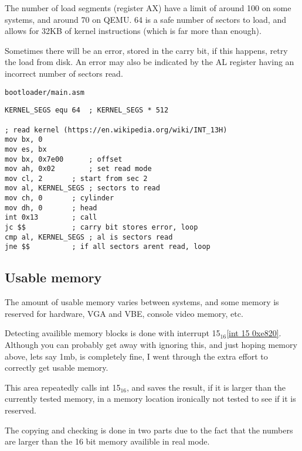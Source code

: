 \documentclass{article}
\begin{document}
The number of load segments (register AX)\cite{int 13h} have a limit of around 100
on some systems, and around 70 on QEMU. 64 is a safe number of sectors to load,
and allows for 32KB of kernel instructions (which is far more than enough).

Sometimes there will be an error, stored in the carry bit\cite{int 13h}, if this
happens, retry the load from disk. An error may also be indicated by the AL register
having an incorrect number of sectors read.

\begin{verbatim}
bootloader/main.asm
\end{verbatim}
\begin{verbatim}
KERNEL_SEGS equ 64	; KERNEL_SEGS * 512

; read kernel (https://en.wikipedia.org/wiki/INT_13H)
mov bx, 0
mov es, bx
mov bx, 0x7e00		; offset
mov ah, 0x02		; set read mode
mov cl, 2		; start from sec 2
mov al, KERNEL_SEGS	; sectors to read
mov ch, 0		; cylinder
mov dh, 0		; head
int 0x13		; call
jc $$			; carry bit stores error, loop
cmp al, KERNEL_SEGS	; al is sectors read
jne $$			; if all sectors arent read, loop
\end{verbatim}

\subsection{Usable memory}

The amount of usable memory varies between systems,
and some memory is reserved for hardware, VGA and VBE,
console video memory, etc.

Detecting availible memory blocks is done with interrupt
15$_{16}$\cite{int 15h}\ref{int 15 0xe820}. Although you can probably get
away with ignoring this, and just hoping memory above,
lets say 1mb, is completely fine, I went through the extra
effort to correctly get usable memory.

This area repeatedly calls int 15$_{16}$, and saves the result,
if it is larger than the currently tested memory, in a memory location
ironically not tested to see if it is reserved.

The copying and checking is done in two parts due to the fact
that the numbers are larger than the 16 bit memory availible in real mode.
\end{document}
